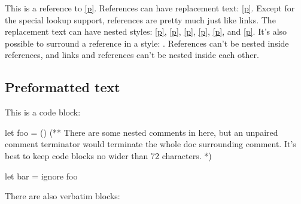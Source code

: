 \begin{flushleft}\end{flushleft}%
This is a reference to \hyperref[container-page-test+u+package+++ml-module-Markup-val-foo]{[p\pageref*{container-page-test+u+package+++ml-module-Markup-val-foo}]}. References can have replacement text: \hyperref[container-page-test+u+package+++ml-module-Markup-val-foo]{[p\pageref*{container-page-test+u+package+++ml-module-Markup-val-foo}]}. Except for the special lookup support, references are pretty much just like links. The replacement text can have nested styles: \hyperref[container-page-test+u+package+++ml-module-Markup-val-foo]{[p\pageref*{container-page-test+u+package+++ml-module-Markup-val-foo}]}, \hyperref[container-page-test+u+package+++ml-module-Markup-val-foo]{[p\pageref*{container-page-test+u+package+++ml-module-Markup-val-foo}]}, \hyperref[container-page-test+u+package+++ml-module-Markup-val-foo]{[p\pageref*{container-page-test+u+package+++ml-module-Markup-val-foo}]}, \hyperref[container-page-test+u+package+++ml-module-Markup-val-foo]{[p\pageref*{container-page-test+u+package+++ml-module-Markup-val-foo}]}, \hyperref[container-page-test+u+package+++ml-module-Markup-val-foo]{[p\pageref*{container-page-test+u+package+++ml-module-Markup-val-foo}]}, and \hyperref[container-page-test+u+package+++ml-module-Markup-val-foo]{[p\pageref*{container-page-test+u+package+++ml-module-Markup-val-foo}]}. It's also possible to surround a reference in a style: . References can't be nested inside references, and links and references can't be nested inside each other.

\subsection{Preformatted text\label{preformatted-text}}%
\begin{flushleft}\end{flushleft}%
This is a code block:\medbreak
\begin{ocamlcodeblock}
let foo = ()
(** There are some nested comments in here, but an unpaired comment
    terminator would terminate the whole doc surrounding comment. It's
    best to keep code blocks no wider than 72 characters. *)

let bar =
  ignore foo
\end{ocamlcodeblock}\medbreak
\begin{flushleft}\end{flushleft}%
There are also verbatim blocks:

